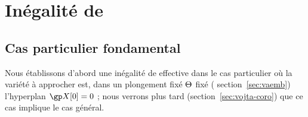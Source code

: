 
\chapter{Inégalité de } \label{chap:vojta}

\section{Cas particulier fondamental}
\label{sec:vojta-main}

Nous établissons d'abord une inégalité de  effective dans le cas
particulier où la variété à approcher est, dans un plongement fixé \( \Theta
\) fixé ( section~\vref{sec:vaemb}) l'hyperplan \( \vp[0] = 0 \) ;
nous verrons plus tard (section~\vref{sec:vojta-coro}) que ce cas implique le
cas général.

